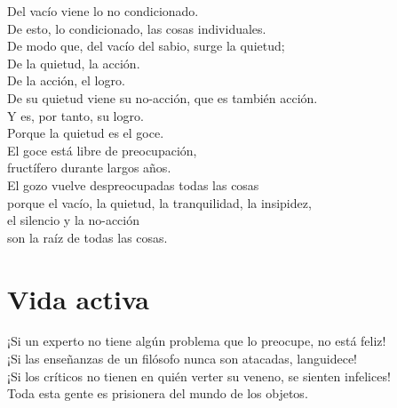 \documentclass[book,b5paper,hidelinks,final]{memoir}
\begin{document}
	Del vacío viene lo no condicionado.\\
	De esto, lo condicionado, las cosas individuales.\\
	De modo que, del vacío del sabio, surge la quietud;\\
	De la quietud, la acción.\\
	De la acción, el logro.\\
	De su quietud viene su no-acción, que es también acción.\\
	Y es, por tanto, su logro.\\
	Porque la quietud es el goce.\\
	El goce está libre de preocupación,\\
	fructífero durante largos años.\\
	El gozo vuelve despreocupadas todas las cosas\\
	porque el vacío, la quietud, la tranquilidad, la insipidez,\\
	el silencio y la no-acción\\
	son la raíz de todas las cosas.
	
	\chapter*{Vida activa}
	
	¡Si un experto no tiene algún problema que lo preocupe, no está feliz!\\
	¡Si las enseñanzas de un filósofo nunca son atacadas, languidece!\\
	¡Si los críticos no tienen en quién verter su veneno, se sienten
	infelices!\\
	Toda esta gente es prisionera del mundo de los objetos.
	
\end{document}

